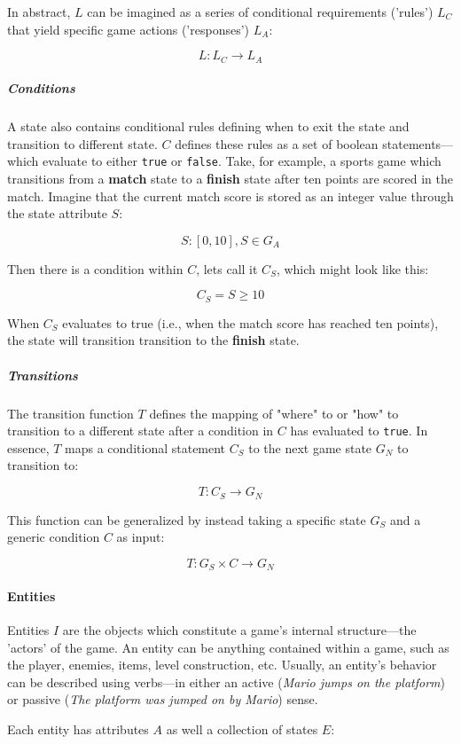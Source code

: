 \documentclass{report}
\begin{document}
In abstract, $L$ can be imagined as a series of conditional requirements ('rules') $L_C$ that yield specific game actions ('responses') $L_A$:

$$L: L_C \longrightarrow L_A$$


\subparagraph{Conditions}
A state also contains conditional rules defining when to exit the state and transition to different state. $C$ defines these rules as a set of boolean statements---which evaluate to either \texttt{true} or \texttt{false}.
Take, for example, a sports game which transitions from a \textbf{match} state to a \textbf{finish} state after ten points are scored in the match. Imagine that the current match score is stored as an integer value through the state attribute $S$: 

$$
S: [0, 10],  S \in G_A
$$

Then there is a condition within $C$, lets call it $C_S$, which might look like this:

$$
C_S = S\geq10 
$$

When $C_S$ evaluates to true (i.e., when the match score has reached ten points), the state will transition transition to the \textbf{finish} state.

\subparagraph{Transitions}
The transition function $T$ defines the mapping of "where" to or "how" to transition to a different state after a condition in $C$ has evaluated to \texttt{true}. In essence, $T$ maps a conditional statement $C_S$ to the next game state $G_N$ to transition to:

$$
T: C_S \longrightarrow G_N
$$

This function can be generalized by instead taking a specific state $G_S$ and a generic condition $C$ as input:

$$
T: G_S \times C \longrightarrow G_N
$$

\paragraph{Entities}
Entities $I$ are the objects which constitute a game's internal structure---the 'actors' of the game. An entity can be anything contained within a game, such as the player, enemies, items, level construction, etc.  Usually, an entity's behavior can be described using verbs---in either an active (\emph{Mario jumps on the platform}) or passive (\emph{The platform was jumped on by Mario}) sense.

Each entity has attributes $A$ as well a collection of states $E$:
\end{document}
